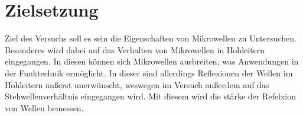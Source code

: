 \section{Zielsetzung}
\label{sec:Zielsetzung}

Ziel des Versuchs soll es sein die Eigenschaften von Mikrowellen zu Untersuchen.
Besonderes wird dabei auf das Verhalten von Mikrowellen in Hohleitern eingegangen.
In diesen können sich Mikrowellen ausbreiten, was Anwendungen in der Funktechnik ermöglicht.
In dieser sind allerdings Reflexionen der Wellen im Hohleitern äußerst unerwünscht, weswegen im Versuch außerdem auf das Stehwellenverhältnis eingegangen wird.
Mit diesem wird die stärke der Refelxion von Wellen bemessen.